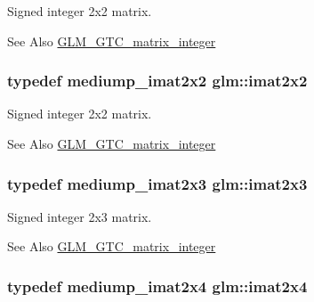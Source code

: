Signed integer 2x2 matrix. 

\begin{DoxySeeAlso}{See Also}
\hyperlink{group__gtc__matrix__integer}{G\-L\-M\-\_\-\-G\-T\-C\-\_\-matrix\-\_\-integer} 
\end{DoxySeeAlso}
\hypertarget{group__gtc__matrix__integer_gaf7f44f44d966377666d41ed059524732}{
\subsubsection[{imat2x2}]{\setlength{\rightskip}{0pt plus 5cm}typedef mediump\-\_\-imat2x2 {\bf glm\-::imat2x2}}}\label{group__gtc__matrix__integer_gaf7f44f44d966377666d41ed059524732}


Signed integer 2x2 matrix. 

\begin{DoxySeeAlso}{See Also}
\hyperlink{group__gtc__matrix__integer}{G\-L\-M\-\_\-\-G\-T\-C\-\_\-matrix\-\_\-integer} 
\end{DoxySeeAlso}
\hypertarget{group__gtc__matrix__integer_ga143bc5177bac9991d84b70da03952516}{
\subsubsection[{imat2x3}]{\setlength{\rightskip}{0pt plus 5cm}typedef mediump\-\_\-imat2x3 {\bf glm\-::imat2x3}}}\label{group__gtc__matrix__integer_ga143bc5177bac9991d84b70da03952516}


Signed integer 2x3 matrix. 

\begin{DoxySeeAlso}{See Also}
\hyperlink{group__gtc__matrix__integer}{G\-L\-M\-\_\-\-G\-T\-C\-\_\-matrix\-\_\-integer} 
\end{DoxySeeAlso}
\hypertarget{group__gtc__matrix__integer_gafe2d058e164fd1badace451ffcf4ae46}{
\subsubsection[{imat2x4}]{\setlength{\rightskip}{0pt plus 5cm}typedef mediump\-\_\-imat2x4 {\bf glm\-::imat2x4}}}\label{group__gtc__matrix__integer_gafe2d058e164fd1badace451ffcf4ae46}


